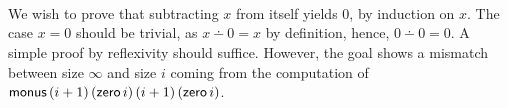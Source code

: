 \begin{code}%
\>[0]\AgdaSpace{}%
\AgdaSymbol{:}\AgdaSpace{}%
\AgdaSpace{}%
\AgdaSpace{}%
\AgdaSpace{}%
\AgdaSpace{}%
\AgdaSpace{}%
\AgdaSpace{}%
\AgdaSpace{}%
\AgdaSpace{}%
\AgdaSpace{}%
\AgdaSpace{}%
\AgdaSpace{}%
\AgdaSpace{}%
\AgdaSpace{}%
\<%
\\
\>[0]\AgdaSpace{}%
%
\>[16]%
\>[27]\AgdaSpace{}%
\AgdaFunction{+}\AgdaSpace{}%
\AgdaSymbol{)}\AgdaSpace{}%
\AgdaSymbol{(}\AgdaSpace{}%
\AgdaSymbol{)}%
\>[47]\AgdaSymbol{=}%
\>[50]\<%
\\
\>[0]\AgdaSpace{}%
\AgdaSpace{}%
\AgdaFunction{+}\AgdaSpace{}%
\AgdaSymbol{)}%
\>[16]\AgdaSymbol{(}\AgdaSpace{}%
\AgdaSymbol{)}%
\>[27]\AgdaSpace{}%
\AgdaFunction{+}\AgdaSpace{}%
\AgdaSymbol{)}\AgdaSpace{}%
\AgdaSymbol{(}\AgdaSpace{}%
\AgdaSpace{}%
\AgdaSymbol{)}%
\>[47]\AgdaSymbol{=}%
\>[50]\AgdaSpace{}%
\<%
\\
\>[0]\AgdaSpace{}%
\AgdaSpace{}%
\AgdaFunction{+}\AgdaSpace{}%
\AgdaSymbol{)}%
\>[16]\AgdaSymbol{(}\AgdaSpace{}%
\AgdaSpace{}%
\AgdaSymbol{)}%
\>[27]\AgdaSpace{}%
\AgdaFunction{+}\AgdaSpace{}%
\AgdaSymbol{)}\AgdaSpace{}%
\AgdaSymbol{(}\AgdaSpace{}%
\AgdaSpace{}%
\AgdaSymbol{)}%
\>[47]\AgdaSymbol{=}%
\>[50]\AgdaSpace{}%
\AgdaSpace{}%
\AgdaSpace{}%
\AgdaSpace{}%
\<%
\end{code}

We wish to prove that subtracting $x$ from itself yields $0$, by
induction on $x$.  The case $x = 0$ should be trivial, as $x \dotminus
0 = x$ by definition, hence, $0 \dotminus 0 = 0$.  A simple proof by
reflexivity should suffice.  However, the goal shows a mismatch
between size $\infty$ and size $i$ coming from the computation of
$\amonus\,(i + 1)\,(\azero\,i)\,(i + 1)\,(\azero\,i)$.


